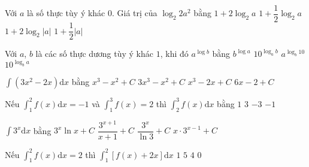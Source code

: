 \begin{ex}%
	Với $a$ là số thực tùy ý khác $0$. Giá trị của $\log_2 2a^2$ bằng
	\choice
	{$1+2\log_2 a$}
	{$1+\dfrac{1}{2}\log_2 a$}
	{\True $1+2\log_2 \left| a \right |$}
	{$1+\dfrac{1}{2}\left| a \right |$}
\end{ex}

\begin{ex}%
	Với $a$, $b$ là các số thực dương tùy ý khác $1$, khi đó $a^{\log b}$ bằng
	\choice
	{\True $b^{\log a}$}
	{$10^{\log_a b}$}
	{$a^{\log_b 10}$}
	{$10^{\log_b a}$}
\end{ex}

\begin{ex}%
	$\displaystyle \int (3x^2-2x) \mathrm{d}x$ bằng
	\choice
	{\True $x^3-x^2+C$}
	{$3x^3-x^2+C$}
	{$x^3-2x+C$}
	{$6x-2+C$}
\end{ex}

\begin{ex}%
	Nếu $\displaystyle \int_{1}^{2}f(x)\mathrm{d}x=-1$ và $\displaystyle \int_{1}^{3}f(x)=2$ thì $\displaystyle\int_{2}^{3} f(x)\mathrm{d}x$ bằng
	\choice
	{$1$}
	{\True $3$}
	{$-3$}
	{$-1$}
\end{ex}

\begin{ex}%
	$\displaystyle \int 3^x \mathrm{d}x$ bằng
	\choice
	{$3^x\ln{x}+C$}
	{$\dfrac{3^{x+1}}{x+1}+C$}
	{\True $\dfrac{3^x}{\ln{3}}+C$}
	{$x\cdot 3^{x-1}+C$}
\end{ex}

\begin{ex}%
	Nếu $\displaystyle \int_{1}^{2}f(x)\mathrm{d}x=2$ thì $\displaystyle\int_{1}^{2}[f(x)+2x]\mathrm{d}x$
	\choice
	{$1$}
	{\True $5$}
	{$4$}
	{$0$}
\end{ex}

